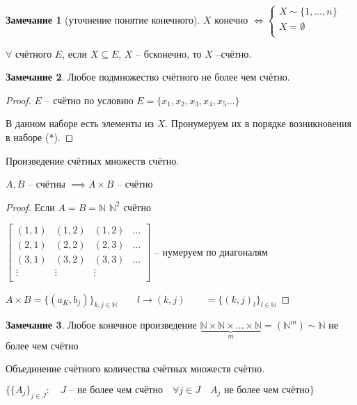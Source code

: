 \documentclass{book}
\newcommand\N{\ensuremath{\mathbb{N}}}
\renewcommand\O{\ensuremath{\emptyset}}
\theoremstyle{definition}
\newtheorem*{note}{Замечание}
\begin{document}
    \begin{note}
        [уточнение понятие конечного]
        $X$ конечно $\iff \begin{cases}
            X\sim \{1, \ldots, n\}\\
            X = \O \\
        \end{cases}$

    \end{note}
    \begin{theorem}
        $\forall $ счётного $E$, если $X\subseteq E$, $X$ -- бсконечно, то $X$ --счётно.
    \end{theorem}
    \begin{note}
        Любое подмножество счётного не более чем счётно.
    \end{note}
    \begin{proof}
        $E$ -- счётно по условию $E = \{x_1, x_2, x_3, x_4, x_5 \ldots\}$

        В данном наборе есть элементы  из $X$. Пронумеруем их в порядке возникновения в наборе (*).
    \end{proof}
    \begin{theorem}
        Произведение счётных множеств счётно.

        $A,B$ -- счётны $\implies A\times B$ -- счётно
    \end{theorem}
    \begin{proof}
        Если $A = B = \N $ $\N ^2$ счётно

        $\begin{bmatrix} (1,1)&(1,2)&(1,2)&\ldots\\ (2,1)&(2,2)&(2,3)&\ldots\\ (3,1)&(3,2)&(3,3)&\ldots\\ \vdots& \vdots& \vdots& \\\end{bmatrix} $ -- нумеруем по диагоналям

        $A\times B = \{(a_K, b_j)\}_{k,j\in \N }\qquad l\to (k,j)\qquad =\{(k,j)_l\}_{l\in \N }$
    \end{proof}
    \begin{note}
        Любое конечное произведение $\underbrace{\N \times \N \times \ldots\times \N }_{m} = (\N ^m) \sim  \N $ не более чем счётно

    \end{note}
    \begin{theorem}
        Объединение счётного количества счётных множеств счётно.
    \end{theorem}
        $\{\{A_j\}_{j\in J}:\quad J \text{ -- не более чем счётно} \quad \forall j\in J\quad A_j \text{ не более чем счётно}\}$
\end{document}
